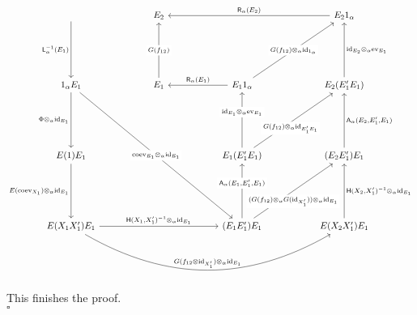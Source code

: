 \begin{prf}
\begin{equation*}
\begin{tikzcd}[row sep=6em,column sep=5.5em]
  \ar{d}[swap]{\mathsf{L}_{\alpha}^{-1}(E_{1})}
  &
  E_{2}
  &
  &
  E_{2} 1_{\alpha}
  \ar{ll}[swap]{\mathsf{R}_{\alpha}(E_{2})}
  \\
  1_{\alpha} E_{1}
  \ar{ddrr}[description]{\mathrm{coev}_{E_{1}} \otimes_{\alpha} \mathrm{id}_{E_{1}}}
  \ar{d}[swap]{\Phi \otimes_{\alpha} \mathrm{id}_{E_{1}}}
  &
  E_{1}
  \ar{u}[description]{G(f_{12})}
  &
  E_{1} 1_{\alpha}
  \ar{ur}[description]{G(f_{12}) \otimes_{\alpha} \mathrm{id}_{1_{\alpha}}}
  \ar{l}[swap]{\mathsf{R}_{\alpha}(E_{1})}
  &
  E_{2} (E_{1}^{\prime} E_{1})
  \ar{u}[swap]{\mathrm{id}_{E_{2}} \otimes_{\alpha} \mathrm{ev}_{E_{1}}}
  \\
  E(1) E_{1}
  \ar{d}[swap]{E(\mathrm{coev}_{X_{1}}) \otimes_{\alpha} \mathrm{id}_{E_{1}}}
  &
  &
  E_{1} (E_{1}^{\prime} E_{1})
  \ar{u}[description,yshift=3mm]{\mathrm{id}_{E_{1}} \otimes_{\alpha} \mathrm{ev}_{E_{1}}}
  \ar{ur}[description,xshift=-1mm,yshift=-3mm]{G(f_{12}) \otimes_{\alpha} \mathrm{id}_{E_{1}^{\prime} E_{1}}}
  &
  (E_{2} E_{1}^{\prime}) E_{1}
  \ar{u}[swap]{\mathsf{A}_{\alpha}(E_{2},E_{1}^{\prime},E_{1})}
  \\
  E(X_{1} X_{1}^{\prime}) E_{1}
  \ar{rr}{\mathsf{H}(X_{1},X_{1}^{\prime})^{-1} \otimes_{\alpha} \mathrm{id}_{E_{1}}}
  \ar[bend right]{rrr}{G(f_{12} \otimes \mathrm{id}_{X_{1}^{\prime}}) \otimes_{\alpha} \mathrm{id}_{E_{1}}}
  &
  &
  (E_{1} E_{1}^{\prime}) E_{1}
  \ar{u}[description,yshift=3mm]{\mathsf{A}_{\alpha}(E_{1},E_{1}^{\prime},E_{1})}
  \ar{ur}[description,yshift=-4mm]{(G(f_{12}) \otimes_{\alpha} G(\mathrm{id}_{X_{1}^{\prime}})) \otimes_{\alpha} \mathrm{id}_{E_{1}}}
  &
  E(X_{2} X_{1}^{\prime}) E_{1}
  \ar{u}[swap]{\mathsf{H}(X_{2},X_{1}^{\prime})^{-1} \otimes_{\alpha} \mathrm{id}_{E_{1}}}
\end{tikzcd}
\end{equation*}
This finishes the proof.
\\
\phantom{proven}
\hfill
$\square$
\end{prf}
